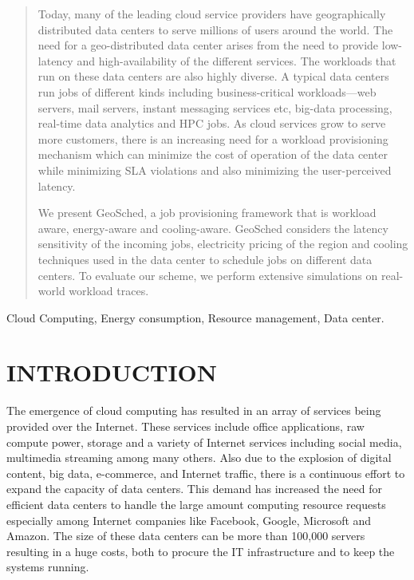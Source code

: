 \documentclass[conference,12pt]{IEEEtran}
\begin{document}
\maketitle


\begin{abstract}
Today, many of the leading cloud service providers have geographically distributed data centers to serve millions of users around the world. The need for a geo-distributed data center arises from the need to provide low-latency and  high-availability of the different services. The workloads that run on these data centers are also highly diverse. A typical data centers run jobs of different kinds including business-critical workloads---web servers, mail servers, instant messaging services etc, big-data processing, real-time data analytics and HPC jobs. As cloud services grow to serve more customers, there is an increasing need for a workload provisioning mechanism which can minimize the cost of operation of the data center while minimizing SLA violations and also minimizing the user-perceived latency. 

We present GeoSched, a job provisioning framework that is workload aware, energy-aware and cooling-aware. GeoSched considers the latency sensitivity of the incoming jobs, electricity pricing of the region and cooling techniques used in the data center to schedule jobs on different data centers. To evaluate our scheme, we perform extensive simulations on real-world workload traces.
\end{abstract}

\begin{IEEEkeywords}
Cloud Computing, Energy consumption, Resource management, Data center.
\end{IEEEkeywords}


\section{INTRODUCTION}
\label{sec:intro}
The emergence of cloud computing has resulted in an array of services being provided over the Internet. These services include office applications, raw compute power, storage and a variety of Internet services including social media, multimedia streaming among many others. Also due to the explosion of digital content, big data, e-commerce, and Internet traffic, there is a continuous effort to expand the capacity of data centers. This demand has increased the need for efficient data centers to handle the large amount computing resource requests especially among Internet companies like Facebook, Google, Microsoft and Amazon. The size of these data centers can be more than 100,000 servers \cite{greenberg2008cost} resulting in a huge costs, both to procure the IT infrastructure and to keep the systems running.
\end{document}

